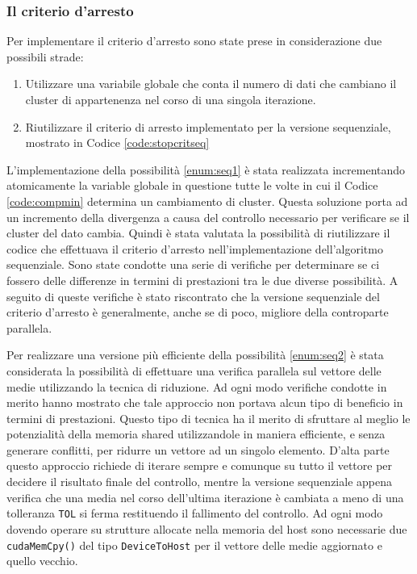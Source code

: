 \documentclass[10pt,twocolumn,letterpaper]{article}
\begin{document}
\subsubsection*{Il criterio d'arresto}

Per implementare il criterio d'arresto sono state prese in considerazione due possibili strade:
\begin{enumerate}
	\item\label{enum:seq1} Utilizzare una variabile globale che conta il numero di dati che cambiano il cluster di appartenenza nel corso di una singola iterazione.
	\item\label{enum:seq2} Riutilizzare il criterio di arresto implementato per la versione sequenziale, mostrato in Codice \ref{code:stopcritseq}
\end{enumerate}
L'implementazione della possibilità \ref{enum:seq1} è stata realizzata incrementando atomicamente la variable globale in questione tutte le volte in cui il Codice \ref{code:compmin} determina un cambiamento di cluster. Questa soluzione porta ad un incremento della divergenza a causa del controllo necessario per verificare se il cluster del dato cambia. Quindi è stata valutata la possibilità di riutilizzare il codice che effettuava il criterio d'arresto nell'implementazione dell'algoritmo sequenziale. Sono state condotte una serie di verifiche per determinare se ci fossero delle differenze in termini di prestazioni tra le due diverse possibilità. A seguito di queste verifiche è stato riscontrato che la versione sequenziale del criterio d'arresto è generalmente, anche se di poco, migliore della controparte parallela.\par
Per realizzare una versione più efficiente della possibilità \ref{enum:seq2} è stata considerata la possibilità di effettuare una verifica parallela sul vettore delle medie utilizzando la tecnica di riduzione. Ad ogni modo verifiche condotte in merito hanno mostrato che tale approccio non portava alcun tipo di beneficio in termini di prestazioni. Questo tipo di tecnica ha il merito di sfruttare al meglio le potenzialità della memoria shared utilizzandole in maniera efficiente, e senza generare conflitti, per ridurre un vettore ad un singolo elemento. D'alta parte questo approccio richiede di iterare sempre e comunque su tutto il vettore per decidere il risultato finale del controllo, mentre la versione sequenziale appena verifica che una media nel corso dell'ultima iterazione è cambiata a meno di una tolleranza \texttt{TOL} si ferma restituendo il fallimento del controllo. Ad ogni modo dovendo operare su strutture allocate nella memoria del host sono necessarie due \texttt{cudaMemCpy()} del tipo \texttt{DeviceToHost} per il vettore delle medie aggiornato e quello vecchio.
\end{document}
